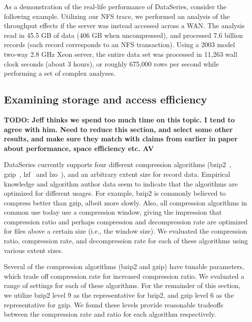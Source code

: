 \documentclass{acm_proc_article-sp}
\begin{document}
As a demonstration of the real-life performance of
DataSeries, consider the following example.  Utilizing our NFS
trace, we performed an analysis of the throughput
effects if the server was instead accessed across a WAN.
The analysis read in 45.5 GB of data (406 GB when uncompressed), and
processed 7.6 billion records (each record corresponds to an NFS
transaction).  Using a 2003 model two-way 2.8 GHz Xeon server, the
entire data set was processed in 11,263 wall clock seconds (about 3
hours), or roughly 675,000 rows per second while performing a set of complex
analyses.



\subsection{Examining storage and access efficiency}\label{sec:efficiency}

{\bf TODO: Jeff thinks we spend too much time on this topic. I tend to 
agree with him. Need to reduce this section, and select some other results,
and make sure they match with claims from earlier in paper about performance,
space efficiency etc. AV }


DataSeries currently supports four different compression algorithms
(bzip2~\cite{BZIP}, gzip~\cite{GZIP}, lzf~\cite{LZF} and lzo~\cite{LZO}),
and an arbitrary extent size for record data.  Empirical knowledge and
algorithm author data seem to indicate that the algorithms are
optimized for different usages.  For example, bzip2 is commonly
believed to compress better than gzip, albeit more slowly.  Also,
all compression algorithms in common use today use a compression
window, giving the impression that compression ratio and perhaps
compression and decompression rate are optimized for files above a
certain size (i.e., the window size).  
We evaluated the compression ratio, compression rate, 
and decompression rate for each of these algorithms
using various extent sizes.

Several of the compression algorithms (bzip2 and gzip)
have tunable parameters, which trade 
off compression rate for increased compression ratio.
We evaluated a range of settings for each of these algorithms.  
For the remainder of this section, we utilize bzip2 level 9 as
the representative for bzip2, and gzip level 6 as the representative
for gzip.  We found these levels provide reasonable tradeoffs
between the compression rate and ratio for each algorithm respectively.
\end{document}

